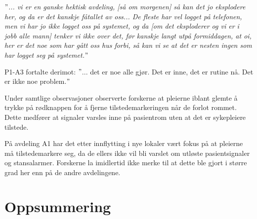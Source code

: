 \noindent
\textit{$"$... vi er en ganske hektisk avdeling, [så om morgenen] så kan det jo eksplodere her, og da er det kanskje fåtallet av oss... De fleste har vel logget på telefonen, men vi har jo ikke logget oss på systemet, og da [om det eksploderer og vi er i jobb alle mann] tenker vi ikke over det, før kanskje langt utpå formiddagen, at oi, her er det noe som har gått oss hus forbi, så kan vi se at det er nesten ingen som har logget seg på systemet.$"$}

\noindent
P1-A3 fortalte derimot: $"$... det er noe alle gjør. Det er inne, det er rutine nå. Det er ikke noe problem.$"$ 

\noindent
Under samtlige observasjoner observerte forskerne at pleierne iblant glemte å trykke på rødknappen for å fjerne tilstedemarkeringen når de forlot rommet. Dette medfører at signaler varsles inne på pasientrom uten at det er sykepleiere tilstede.

\noindent
På avdeling A1 har det etter innflytting i nye lokaler vært fokus på at pleierne må tilstedemarkere seg, da de ellers ikke vil bli varslet om utløste pasientsignaler og stansalarmer. Forskerne la imidlertid ikke merke til at dette ble gjort i større grad her enn på de andre avdelingene.  

\section{Oppsummering}

